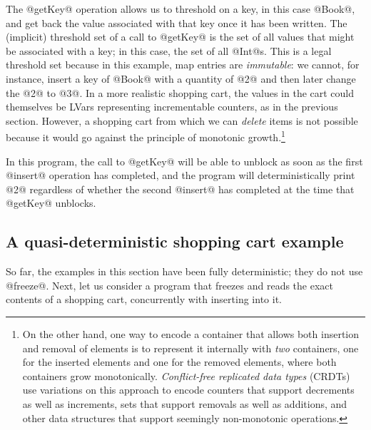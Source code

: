 The @getKey@ operation allows us to threshold on a key, in this case
@Book@, and get back the value associated with that key once it has
been written.  The (implicit) threshold set of a call to @getKey@ is
the set of all values that might be associated with a key; in this
case, the set of all @Int@s.  This is a legal threshold set because in
this example, map entries are \emph{immutable}: we cannot, for
instance, insert a key of @Book@ with a quantity of @2@ and then later
change the @2@ to @3@.  In a more realistic shopping cart, the values
in the cart could themselves be LVars representing incrementable
counters, as in the previous section.    However, a shopping cart from
which we can \emph{delete} items is not possible because it would go
against the principle of monotonic growth.\footnote{On the other hand,
  one way to encode a container that allows both insertion and removal
  of elements is to represent it internally with \emph{two}
  containers, one for the inserted elements and one for the removed
  elements, where both containers grow monotonically.
  \emph{Conflict-free replicated data types} (CRDTs)~\cite{crdts} use
  variations on this approach to encode counters that support
  decrements as well as increments, sets that support removals as well
  as additions, and other data structures that support seemingly
  non-monotonic operations.  }

In this program, the call to @getKey@ will be able to unblock as soon
as the first @insert@ operation has completed, and the program will
deterministically print @2@ regardless of whether the second @insert@
has completed at the time that @getKey@ unblocks.

\subsection{A quasi-deterministic shopping cart example}

So far, the examples in this section have been fully deterministic;
they do not use @freeze@.  Next, let us consider a program that
freezes and reads the exact contents of a shopping cart, concurrently
with inserting into it.

\singlespacing

\doublespacing

